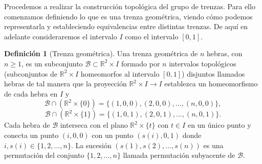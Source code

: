 \documentclass[12pt]{book}
\theoremstyle{definition}
\newtheorem{defi}{Definición}[section]
\begin{document}

Procedemos a realizar la construcción topológica del grupo de trenzas. Para ello comenzamos definiendo lo que es una trenza geométrica, viendo cómo podemos representarla y estableciendo equivalencias entre distintas trenzas. De aquí en adelante consideraremos el intervalo $I$ como el intervalo $[0,1]$.


\begin{defi}[Trenza geométrica]\label{trenza_geom}
Una trenza geométrica de $n$ hebras, con $n \geq 1$, es un subconjunto $\mathcal{B}\subset\mathbb{R}^2\times I$ formado por $n$ intervalos topológicos (subconjuntos de $\mathbb{R}^2\times I$ homeomorfos al intervalo $[0,1]$) disjuntos llamados hebras de tal manera que la proyección $\mathbb{R}^2\times I\rightarrow I$ establezca un homeomorfismo de cada hebra en $I$ y
$$\mathcal{B}\cap(\mathbb{R}^2\times \{0\})=\{(1,0,0),(2,0,0),...,(n,0,0)\},$$
$$\mathcal{B}\cap(\mathbb{R}^2\times \{1\})=\{(1,0,1),(2,0,1),...,(n,0,1)\}.$$
Cada hebra de $\mathcal{B}$ interseca con el plano $\mathbb{R}^2\times \{t\}$ con $t\in I$ en un único punto y conecta un punto $(i,0,0)$ con un punto $(s(i),0,1)$ donde $i,s(i)\in\{1,2,...,n\}$. La sucesión $(s(1),s(2),...,s(n))$ es una permutación del conjunto $\{1,2,...,n\}$ llamada permutación subyacente de $\mathcal{B}$.
\end{defi}
\end{document}
